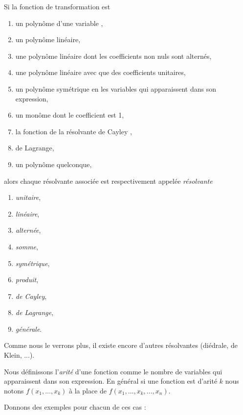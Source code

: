 \documentclass[11pt]{article}
\begin{document}
Si la fonction de transformation est 
\begin{enumerate}
\item un polyn\^ome d'une variable ,
\item un polyn\^ome lin\'eaire,
\item une polyn\^ome lin\'eaire dont les coefficients non nuls sont altern\'es,
\item une polyn\^ome lin\'eaire avec que des coefficients unitaires,
\item un polyn\^ome sym\'etrique en les variables qui apparaissent dans son
expression,
\item un mon\^ome dont le coefficient est 1,
\item la fonction de la r\'esolvante de Cayley ,
\item de Lagrange,
\item un polyn\^ome quelconque,
\end{enumerate}
alors chaque r\'esolvante associ\'ee est respectivement appel\'ee
{\it r\'esolvante }
\begin{enumerate}
\item {\it unitaire},
\item {\it lin\'eaire},
\item {\it altern\'ee},
\item {\it somme},
\item {\it sym\'etrique},
\item {\it produit},
\item {\it de Cayley},
\item {\it de Lagrange},
\item {\it g\'en\'erale}.
\end{enumerate}

Comme nous le verrons plus, il existe encore d'autres r\'esolvantes
(di\'edrale, de Klein, ...).

Nous d\'efinissons l'{\it arit\'e} d'une fonction comme le nombre de
variables qui apparaissent dans son expression. En g\'en\'eral si une fonction
est d'arit\'e $k$ nous notons $f(x_1,\ldots,x_k)$ \`a la place de
$f(x_1,\ldots ,x_k ,\ldots ,x_n)$.

Donnons des exemples pour chacun de ces cas :
\end{document}
